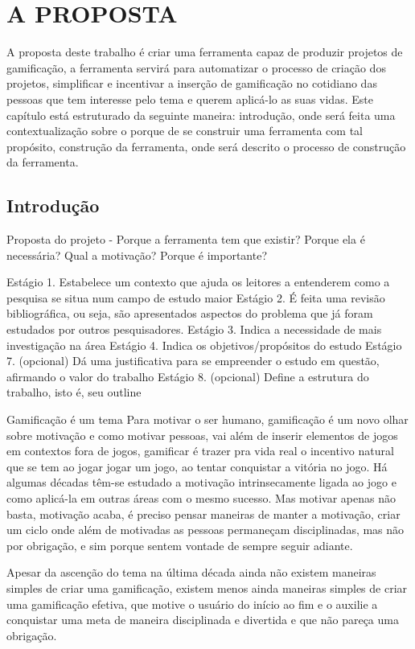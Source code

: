 
\chapter[A Proposta]{A PROPOSTA}

A proposta deste trabalho é criar uma ferramenta capaz de produzir projetos de gamificação, a ferramenta servirá para automatizar o processo de criação dos projetos, simplificar e incentivar a inserção de gamificação no cotidiano das pessoas que tem interesse pelo tema e querem aplicá-lo as suas vidas. Este capítulo está estruturado da seguinte maneira: introdução, onde será feita uma contextualização sobre o porque de se construir uma ferramenta com tal propósito, construção da ferramenta, onde será descrito o processo de construção da ferramenta.

\section{Introdução}


Proposta do projeto - Porque a ferramenta tem que existir?
Porque ela é necessária? Qual a motivação? Porque é importante?

Estágio 1. Estabelece um contexto que ajuda os leitores a entenderem como a
pesquisa se situa num campo de estudo maior
Estágio 2. É feita uma revisão bibliográfica, ou seja, são apresentados aspectos do
problema que já foram estudados por outros pesquisadores.
Estágio 3. Indica a necessidade de mais investigação na área
Estágio 4. Indica os objetivos/propósitos do estudo
Estágio 7. (opcional) Dá uma justificativa para se empreender o estudo em questão,
afirmando o valor do trabalho
Estágio 8. (opcional) Define a estrutura do trabalho, isto é, seu outline


Gamificação é um tema Para motivar o ser humano, gamificação é um novo olhar sobre motivação e como motivar pessoas, vai além de inserir elementos de jogos em contextos fora de jogos, gamificar é trazer pra vida real o incentivo natural que se tem ao jogar jogar um jogo, ao tentar conquistar a vitória no jogo. Há algumas décadas têm-se estudado a motivação intrinsecamente ligada ao jogo e como aplicá-la em outras áreas com o mesmo sucesso. Mas motivar apenas não basta, motivação acaba, é preciso pensar maneiras de manter a motivação, criar um ciclo onde além de motivadas as pessoas permaneçam disciplinadas, mas não por obrigação, e sim porque sentem vontade de sempre seguir adiante.

Apesar da ascenção do tema na última década ainda não existem maneiras simples de criar uma gamificação, existem menos ainda maneiras simples de criar uma gamificação efetiva, que motive o usuário do início ao fim e o auxilie a  conquistar uma meta de maneira disciplinada e divertida e que não pareça uma obrigação.

